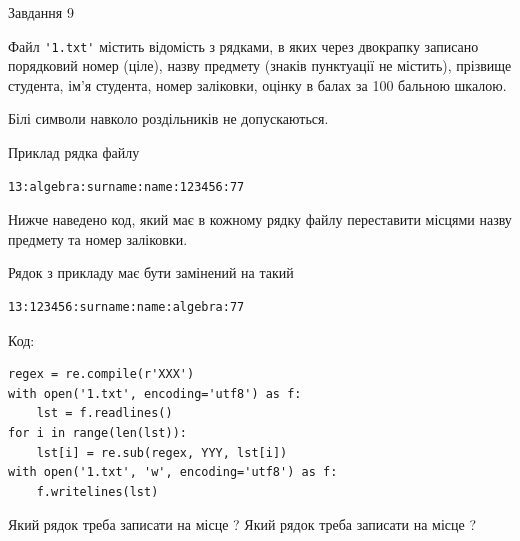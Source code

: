 \documentclass[12pt, ukrainian]{article}
\def\code#1{\Verb!#1!}
\begin{document}
{\begin{minipage}[t]{8.0cm}
\end{minipage}

               
{\begin{center}Завдання {9}\end{center}}
\vspace{-4mm}
Файл \code{'1.txt'} містить відомість з рядками, в яких через двокрапку записано поряд\-ковий номер (ціле), назву предмету (знаків пунктуації не містить), прізвище студента, ім'я студента, номер заліковки, оцінку в балах за 100 бальною шкалою.

Білі символи навколо роздільників не допускаються.

Приклад рядка файлу



\begin{verbatim}
13:algebra:surname:name:123456:77
\end{verbatim}


Нижче наведено код, який має в кожному рядку файлу переставити місцями назву предмету та номер заліковки.

Рядок з прикладу має бути замінений на такий



\begin{verbatim}
13:123456:surname:name:algebra:77
\end{verbatim}




Код:



\begin{verbatim}
regex = re.compile(r'XXX')
with open('1.txt', encoding='utf8') as f:
    lst = f.readlines()
for i in range(len(lst)):
    lst[i] = re.sub(regex, YYY, lst[i])
with open('1.txt', 'w', encoding='utf8') as f:
    f.writelines(lst)
\end{verbatim}





Який рядок треба записати на місце  ?
Який рядок треба записати на місце  ?\par

}
\end{document}
